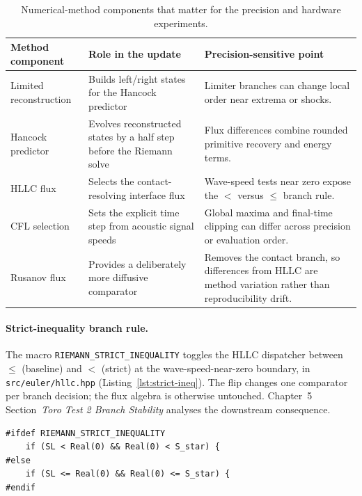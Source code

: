 \begin{table}[htbp]
\centering
\small
\renewcommand{\arraystretch}{1.16}
\begin{tabularx}{\textwidth}{@{}l>{\raggedright\arraybackslash}X>{\raggedright\arraybackslash}X@{}}
\toprule
Method component & Role in the update & Precision-sensitive point \\
\midrule
Limited reconstruction & Builds left/right states for the Hancock predictor &
Limiter branches can change local order near extrema or shocks. \\ \addlinespace
Hancock predictor & Evolves reconstructed states by a half step before the
Riemann solve & Flux differences combine rounded primitive recovery and energy
terms. \\ \addlinespace
HLLC flux & Selects the contact-resolving interface flux & Wave-speed tests near
zero expose the \(<\) versus \(\le\) branch rule. \\ \addlinespace
CFL selection & Sets the explicit time step from acoustic signal speeds &
Global maxima and final-time clipping can differ across precision or evaluation
order. \\ \addlinespace
Rusanov flux & Provides a deliberately more diffusive comparator & Removes the
contact branch, so differences from HLLC are method variation rather than
reproducibility drift. \\
\bottomrule
\end{tabularx}
\caption[Numerical-method components relevant to precision/hardware experiments]{Numerical-method components that matter for the precision and hardware
experiments.}
\label{tab:method-decision-points}
\end{table}

\paragraph{Strict-inequality branch rule.}
The macro \texttt{RIEMANN\_STRICT\_INEQUALITY} toggles the HLLC dispatcher between $\le$ (baseline) and $<$ (strict) at the wave-speed-near-zero boundary, in \texttt{src/euler/hllc.hpp} (Listing~\ref{lst:strict-ineq}). The flip changes one comparator per branch decision; the flux algebra is otherwise untouched. Chapter~5 Section~\emph{Toro Test 2 Branch Stability} analyses the downstream consequence.

\begin{lstlisting}[style=fpListing,
  caption={HLLC branch dispatcher: baseline ($\le$) vs strict ($<$) selected at compile time by \texttt{RIEMANN\_STRICT\_INEQUALITY} (\texttt{src/euler/hllc.hpp}, first of two parallel blocks).},
  label=lst:strict-ineq]
#ifdef RIEMANN_STRICT_INEQUALITY
    if (SL < Real(0) && Real(0) < S_star) {
#else
    if (SL <= Real(0) && Real(0) <= S_star) {
#endif
\end{lstlisting}

